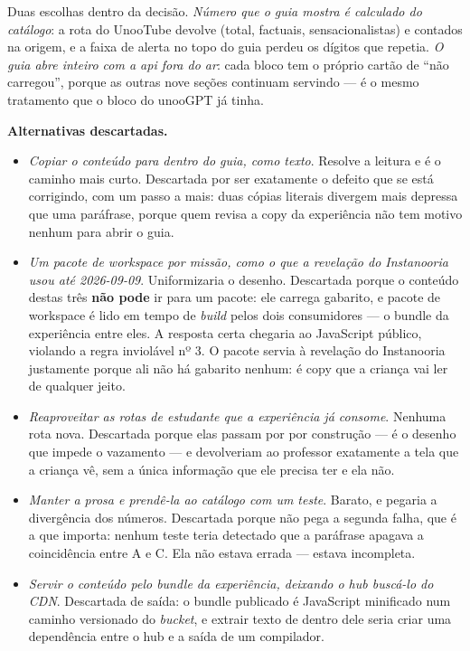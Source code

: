Duas escolhas dentro da decisão. \emph{Número que o guia mostra é calculado do
catálogo}: a rota do UnooTube devolve  (total, factuais,
sensacionalistas) e  contados na origem, e a faixa de alerta no
topo do guia perdeu os dígitos que repetia. \emph{O guia abre inteiro com a api
fora do ar}: cada bloco tem o próprio cartão de ``não carregou'', porque as
outras nove seções continuam servindo --- é o mesmo tratamento que o bloco do
unooGPT já tinha.

\textbf{Alternativas descartadas.}
\begin{itemize}
  \item \emph{Copiar o conteúdo para dentro do guia, como texto}. Resolve a
    leitura e é o caminho mais curto. Descartada por ser exatamente o defeito
    que se está corrigindo, com um passo a mais: duas cópias literais divergem
    mais depressa que uma paráfrase, porque quem revisa a copy da experiência
    não tem motivo nenhum para abrir o guia.
  \item \emph{Um pacote de workspace por missão, como o que a revelação do
    Instanooria usou até 2026-09-09}. Uniformizaria o desenho. Descartada porque o
    conteúdo destas três \textbf{não pode} ir para um pacote: ele carrega
    gabarito, e pacote de workspace é lido em tempo de \emph{build} pelos dois
    consumidores --- o bundle da experiência entre eles. A resposta certa
    chegaria ao JavaScript público, violando a regra inviolável nº 3. O pacote
    servia à revelação do Instanooria justamente porque ali não há gabarito
    nenhum: é copy que a criança vai ler de qualquer jeito.
  \item \emph{Reaproveitar as rotas de estudante que a experiência já consome}.
    Nenhuma rota nova. Descartada porque elas passam por  por
    construção --- é o desenho que impede o vazamento --- e devolveriam ao
    professor exatamente a tela que a criança vê, sem a única informação que ele
    precisa ter e ela não.
  \item \emph{Manter a prosa e prendê-la ao catálogo com um teste}. Barato, e
    pegaria a divergência dos números. Descartada porque não pega a segunda
    falha, que é a que importa: nenhum teste teria detectado que a paráfrase
    apagava a coincidência entre A e C. Ela não estava errada --- estava
    incompleta.
  \item \emph{Servir o conteúdo pelo bundle da experiência, deixando o hub
    buscá-lo do CDN}. Descartada de saída: o bundle publicado é JavaScript
    minificado num caminho versionado do \emph{bucket}, e extrair texto de
    dentro dele seria criar uma dependência entre o hub e a saída de um
    compilador.
\end{itemize}

